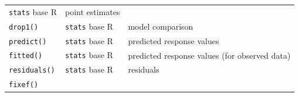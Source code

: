 \documentclass[
]{book}
\begin{document}
\begin{longtable}[]{@{}lll@{}}
\begin{minipage}[t]{0.17\columnwidth}
\texttt{stats} base R\strut
\end{minipage} & \begin{minipage}[t]{0.59\columnwidth}\raggedright
point estimates\strut
\end{minipage}\tabularnewline
\begin{minipage}[t]{0.16\columnwidth}\raggedright
\texttt{drop1()}\strut
\end{minipage} & \begin{minipage}[t]{0.17\columnwidth}\raggedright
\texttt{stats} base R\strut
\end{minipage} & \begin{minipage}[t]{0.59\columnwidth}\raggedright
model comparison\strut
\end{minipage}\tabularnewline
\begin{minipage}[t]{0.16\columnwidth}\raggedright
\texttt{predict()}\strut
\end{minipage} & \begin{minipage}[t]{0.17\columnwidth}\raggedright
\texttt{stats} base R\strut
\end{minipage} & \begin{minipage}[t]{0.59\columnwidth}\raggedright
predicted response values\strut
\end{minipage}\tabularnewline
\begin{minipage}[t]{0.16\columnwidth}\raggedright
\texttt{fitted()}\strut
\end{minipage} & \begin{minipage}[t]{0.17\columnwidth}\raggedright
\texttt{stats} base R\strut
\end{minipage} & \begin{minipage}[t]{0.59\columnwidth}\raggedright
predicted response values (for observed data)\strut
\end{minipage}\tabularnewline
\begin{minipage}[t]{0.16\columnwidth}\raggedright
\texttt{residuals()}\strut
\end{minipage} & \begin{minipage}[t]{0.17\columnwidth}\raggedright
\texttt{stats} base R\strut
\end{minipage} & \begin{minipage}[t]{0.59\columnwidth}\raggedright
residuals\strut
\end{minipage}\tabularnewline
\begin{minipage}[t]{0.16\columnwidth}\raggedright
\texttt{fixef()}\strut
\end{minipage} & \begin{minipage}[t]{0.17\columnwidth}\raggedright

\end{minipage}
\end{longtable}
\end{document}
